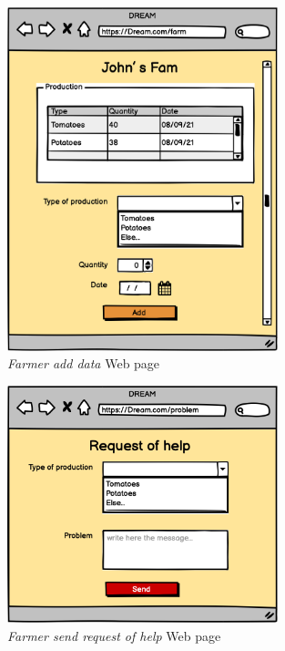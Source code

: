\begin{figure}[H]
    \begin{center}
    \includegraphics[width=0.7\textwidth]{mocups/AddData.png}
    \caption{\emph{Farmer add data} Web page}
    \label{fig:addData}
    \end{center}
\end{figure}

\begin{figure}[H]
    \begin{center}
    \includegraphics[width=0.7\textwidth]{mocups/Help.png}
    \caption{\emph{Farmer send request of help} Web page}
    \label{fig:helpRequest}
    \end{center}
\end{figure}

